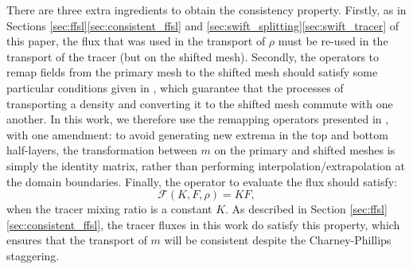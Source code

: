 \documentclass{ametsocV6.1}
\begin{document}
There are three extra ingredients to obtain the consistency property.
Firstly, as in Sections \ref{sec:ffsl}\ref{sec:consistent_ffsl}  and \ref{sec:swift_splitting}\ref{sec:swift_tracer} of this paper, the flux that was used in the transport of $\rho$ must be re-used in the transport of the tracer (but on the shifted mesh).
Secondly, the operators to remap fields from the primary mesh to the shifted mesh should satisfy some particular conditions given in \citet{bendall2023solution}, which guarantee that the processes of transporting a density and converting it to the shifted mesh commute with one another.
In this work, we therefore use the remapping operators presented in \citet{bendall2023solution}, with one amendment: to avoid generating new extrema in the top and bottom half-layers, the transformation between $m$ on the primary and shifted meshes is simply the identity matrix, rather than performing interpolation/extrapolation at the domain boundaries.
Finally, the operator to evaluate the flux should satisfy:
\begin{equation}
\mathcal{F}(K,F,\rho) = KF,
\end{equation}
when the tracer mixing ratio is a constant $K$.
As described in Section \ref{sec:ffsl}\ref{sec:consistent_ffsl}, the tracer fluxes in this work do satisfy this property, which ensures that the transport of $m$ will be consistent despite the Charney-Phillips staggering.
\end{document}
